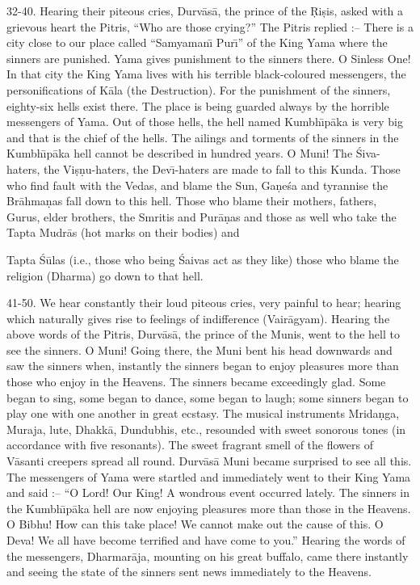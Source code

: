 32-40. Hearing their piteous cries, Durv\=as\=a, the prince of the \d{R}i\d{s}is, asked with a grievous heart the Pitris, ``Who are those crying?'' The Pitris replied :-- There is a city close to our place called ``Samyaman\={\i} Pur\={\i}'' of the King Yama where the sinners are punished. Yama gives punishment to the sinners there. O Sinless One! In that city the King Yama lives with his terrible black-coloured messengers, the personifications of K\=ala (the Destruction). For the punishment of the sinners, eighty-six hells exist there. The place is being guarded always by the horrible messengers of Yama. Out of those hells, the hell named Kumbh\={\i}p\=aka is very big and that is the chief of the hells. The ailings and torments of the sinners in the Kumbh\={\i}p\=aka hell cannot be described in hundred years. O Muni! The \'Siva-haters, the Vi\d{s}\d{n}u-haters, the Dev\={\i}-haters are made to fall to this Kunda. Those who find fault with the Vedas, and blame the Sun, Ga\d{n}e\'sa and tyrannise the Br\=ahma\d{n}as fall down to this hell. Those who blame their mothers, fathers, Gurus, elder brothers, the Smritis and Pur\=a\d{n}as and those as well who take the Tapta Mudr\=as (hot marks on their bodies) and

Tapta \'S\=ulas (i.e., those who being \'Saivas act as they like) those who blame the religion (Dharma) go down to that hell.

41-50. We hear constantly their loud piteous cries, very painful to hear; hearing which naturally gives rise to feelings of indifference (Vair\=agyam). Hearing the above words of the Pitris, Durv\=as\=a, the prince of the Munis, went to the hell to see the sinners. O Muni! Going there, the Muni bent his head downwards and saw the sinners when, instantly the sinners began to enjoy pleasures more than those who enjoy in the Heavens. The sinners became exceedingly glad. Some began to sing, some began to dance, some began to laugh; some sinners began to play one with one another in great ecstasy. The musical instruments Mrida\d{n}ga, Muraja, lute, Dhakk\=a, Dundubhis, etc., resounded with sweet sonorous tones (in accordance with five resonants). The sweet fragrant smell of the flowers of V\=asanti creepers spread all round. Durv\=as\=a Muni became surprised to see all this. The messengers of Yama were startled and immediately went to their King Yama and said :-- ``O Lord! Our King! A wondrous event occurred lately. The sinners in the Kumbh\={\i}p\=aka hell are now enjoying pleasures more than those in the Heavens. O Bibhu! How can this take place! We cannot make out the cause of this. O Deva! We all have become terrified and have come to you.'' Hearing the words of the messengers, Dharmar\=aja, mounting on his great buffalo, came there instantly and seeing the state of the sinners sent news immediately to the Heavens.

